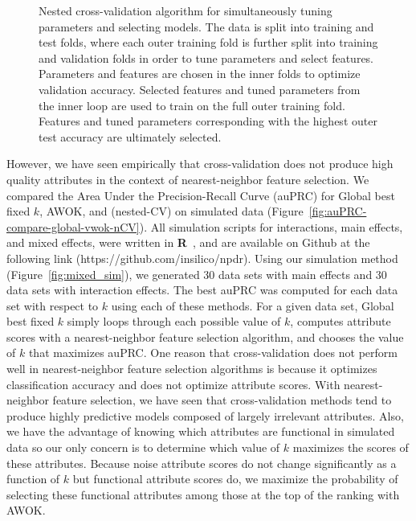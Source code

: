 \documentclass[10pt,letterpaper]{article}
\begin{document}
\begin{figure}[!bht]
	\centering
	\caption{Nested cross-validation algorithm for simultaneously tuning parameters and selecting models. The data is split into training and test folds, where each outer training fold is further split into training and validation folds in order to tune parameters and select features. Parameters and features are chosen in the inner folds to optimize validation accuracy. Selected features and tuned parameters from the inner loop are used to train on the full outer training fold. Features and tuned parameters corresponding with the highest outer test accuracy are ultimately selected.}\label{fig:nCV}
\end{figure}

However, we have seen empirically that cross-validation does not produce high quality attributes in the context of nearest-neighbor feature selection. We compared the Area Under the Precision-Recall Curve (auPRC) for Global best fixed $k$, AWOK, and (nested-CV) on simulated data (Figure~\ref{fig:auPRC-compare-global-vwok-nCV}). All simulation scripts for interactions, main effects, and mixed effects, were written in \textbf{\textsf{R}}~\cite{R}, and are available on Github at the following link (https://github.com/insilico/npdr). Using our simulation method (Figure~\ref{fig:mixed_sim}), we generated 30 data sets with main effects and 30 data sets with interaction effects. The best auPRC was computed for each data set with respect to $k$ using each of these methods. For a given data set, Global best fixed $k$ simply loops through each possible value of $k$, computes attribute scores with a nearest-neighbor feature selection algorithm, and chooses the value of $k$ that maximizes auPRC. One reason that cross-validation does not perform well in nearest-neighbor feature selection algorithms is because it optimizes classification accuracy and does not optimize attribute scores. With nearest-neighbor feature selection, we have seen that cross-validation methods tend to produce highly predictive models composed of largely irrelevant attributes. Also, we have the advantage of knowing which attributes are functional in simulated data so our only concern is to determine which value of $k$ maximizes the scores of these attributes. Because noise attribute scores do not change significantly as a function of $k$ but functional attribute scores do, we maximize the probability of selecting these functional attributes among those at the top of the ranking with AWOK.  
\end{document}
